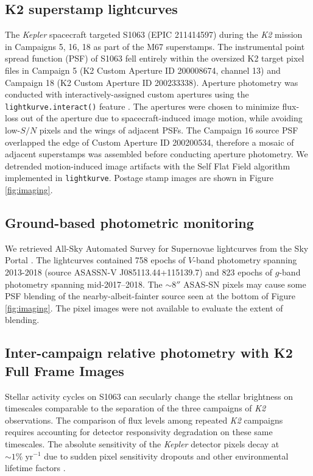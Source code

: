 \documentclass[trackchanges]{aastex631}
\begin{document}
\subsection{K2 superstamp lightcurves}
The \emph{Kepler} spacecraft targeted S1063 (EPIC 211414597) during the \emph{K2} mission \citep{howell14} in Campaigns 5, 16, 18 as part of the M67 superstamps.  The instrumental point spread function (PSF) of S1063 fell entirely within the oversized K2 target pixel files in Campaign 5 (K2 Custom Aperture ID 200008674, channel 13) and Campaign 18 (K2 Custom Aperture ID 200233338).  Aperture photometry was conducted with interactively-assigned custom apertures using the \texttt{lightkurve.interact()} feature \citep{geert_barentsen_2019_2565212}. The apertures were chosen to minimize flux-loss out of the aperture due to spacecraft-induced image motion, while avoiding low-$S/N$ pixels and the wings of adjacent PSFs.  The Campaign 16 source PSF overlapped the edge of Custom Aperture ID 200200534, therefore a mosaic of adjacent superstamps was assembled before conducting aperture photometry.
We detrended motion-induced image artifacts with the Self Flat Field algorithm \citep{vanderburg14} implemented in \texttt{lightkurve}.  Postage stamp images are shown in Figure \ref{fig:imaging}.


\subsection{Ground-based photometric monitoring}
We retrieved All-Sky Automated Survey for Supernovae \citep[ASAS-SN;][]{shappee14} lightcurves from the Sky Portal \citep{2017PASP..129j4502K}.  The lightcurves contained 758 epochs of $V$-band photometry spanning 2013-2018 (source ASASSN-V J085113.44+115139.7) and 823 epochs of $g$-band photometry spanning mid-2017--2018.  The $\sim8''$ ASAS-SN pixels may cause some PSF blending of the nearby-albeit-fainter source seen at the bottom of Figure \ref{fig:imaging}.  The pixel images were not available to evaluate the extent of blending.

\subsection{Inter-campaign relative photometry with K2 Full Frame Images}\label{sec:K2lightcurve}

Stellar activity cycles on S1063 can secularly change the stellar brightness on timescales comparable to the separation of the three campaigns of \emph{K2} observations.  The comparison of flux levels among repeated \emph{K2} campaigns requires accounting for detector responsivity degradation on these same timescales.  The absolute sensitivity of the \emph{Kepler} detector pixels decay at $\sim1 \%\;\textrm{yr}^{-1}$ due to sudden pixel sensitivity dropouts and other environmental lifetime factors \citep{montet17}.
\end{document}
